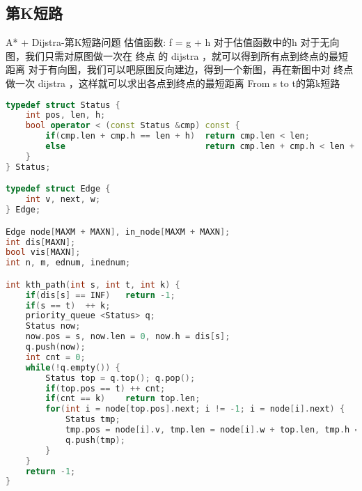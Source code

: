 \subsection{第K短路}
A* + Dijstra-第K短路问题
估值函数: f = g + h
对于估值函数中的h
对于无向图，我们只需对原图做一次在 终点 的 dijstra ，就可以得到所有点到终点的最短距离
对于有向图，我们可以吧原图反向建边，得到一个新图，再在新图中对 终点 做一次 dijstra ，这样就可以求出各点到终点的最短距离
From s to t的第k短路
    \begin{lstlisting}[language=c++]
typedef struct Status {
    int pos, len, h;
    bool operator < (const Status &cmp) const {
        if(cmp.len + cmp.h == len + h)  return cmp.len < len;
        else                            return cmp.len + cmp.h < len + h;
    }
} Status;

typedef struct Edge {
    int v, next, w;
} Edge;

Edge node[MAXM + MAXN], in_node[MAXM + MAXN];
int dis[MAXN];
bool vis[MAXN];
int n, m, ednum, inednum;

int kth_path(int s, int t, int k) {
    if(dis[s] == INF)   return -1;
    if(s == t)  ++ k;
    priority_queue <Status> q;
    Status now;
    now.pos = s, now.len = 0, now.h = dis[s];
    q.push(now);
    int cnt = 0;
    while(!q.empty()) {
        Status top = q.top(); q.pop();
        if(top.pos == t) ++ cnt;
        if(cnt == k)    return top.len;
        for(int i = node[top.pos].next; i != -1; i = node[i].next) {
            Status tmp;
            tmp.pos = node[i].v, tmp.len = node[i].w + top.len, tmp.h = dis[node[i].v];
            q.push(tmp);
        }
    }
    return -1;
}
    \end{lstlisting}

